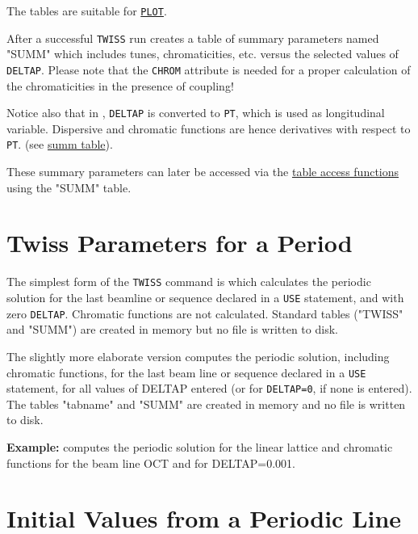 The tables are suitable for \hyperref[chap:plot]{\tt PLOT}.

After a successful {\tt TWISS} run \madx creates a 
table of summary parameters named "SUMM" which includes tunes,
chromaticities, etc. versus the selected values of {\tt DELTAP}.
Please note that the {\tt CHROM} attribute is needed
for a proper calculation of the chromaticities in the presence of
coupling!

Notice also that in \madx, {\tt DELTAP} is converted to {\tt PT}, which is used 
as longitudinal variable. 
Dispersive and chromatic functions are hence derivatives with
respect to {\tt PT}. (see \hyperref[subsec:tables-summ]{summ table}). 

These summary parameters can later be accessed via the 
\hyperref[chap:tables]{table access functions} using the "SUMM" table.  

\section{Twiss Parameters for a Period}
\label{sec:twissperiod}

The simplest form of the {\tt TWISS} command is
which calculates the periodic solution for the last beamline or sequence
declared in a {\tt USE} statement, and with zero {\tt DELTAP}.
Chromatic functions are not calculated. 
Standard tables ("TWISS" and "SUMM") are created in memory but no file
is written to disk. 

The slightly more elaborate version 
computes the periodic solution, including chromatic functions, for the last beam
line or sequence declared in a {\tt USE} statement, for all values of
DELTAP entered (or for {\tt DELTAP=0}, if none is entered). 
The tables "tabname" and "SUMM" are created in memory and no file is
written to disk. 

{\bf Example:} 
computes the periodic solution for the linear lattice and
chromatic functions for the beam line OCT and for DELTAP=0.001. 


\section{Initial Values from a Periodic Line}
\label{sec:twissinitial}

